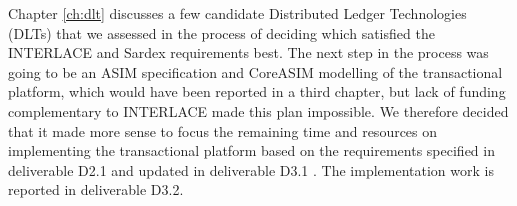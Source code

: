 Chapter \ref{ch:dlt} discusses a few candidate Distributed Ledger Technologies (DLTs) that we assessed in the process of deciding which satisfied the INTERLACE and Sardex requirements best. The next step in the process was going to be an ASIM specification and CoreASIM modelling of the transactional platform, which would have been reported in a third chapter, but lack of funding complementary to INTERLACE made this plan impossible. We therefore decided that it made more sense to focus the remaining time and resources on implementing the transactional platform based on the requirements specified in deliverable D2.1 \cite{INTERLACE_D21} and updated in deliverable D3.1 \cite{INTERLACE_D31}. The implementation work is reported in deliverable D3.2.














\newpage











